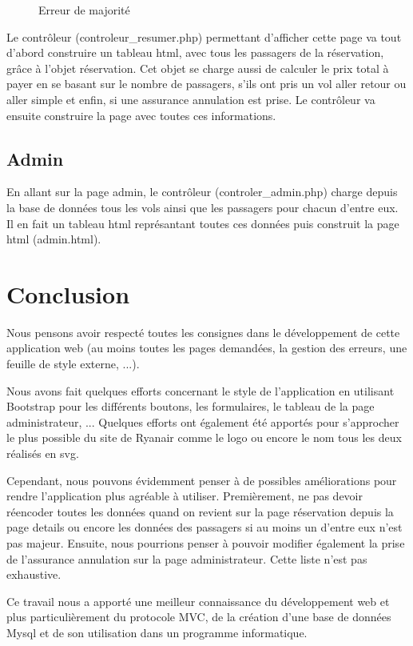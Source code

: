 \documentclass[12pt,a4paper]{article}
\begin{document}
			\begin{figure}
				\caption{Erreur de majorité}
				\label{fig:ageError}
			\end{figure}

			Le contrôleur (controleur\_resumer.php) permettant d'afficher cette page va tout d'abord construire un tableau html, avec tous les passagers  de la réservation, grâce à l'objet réservation. Cet objet se charge aussi de calculer le prix total à payer en se basant sur le nombre de passagers, s'ils ont pris un vol aller retour ou aller simple et enfin, si une assurance annulation est prise. Le contrôleur va ensuite construire la page avec toutes ces informations.

		\subsection{Admin}
			En allant sur la page admin, le contrôleur (controler\_admin.php) charge depuis la base de données tous les vols ainsi que les passagers pour chacun d'entre eux. Il en fait un tableau html représantant toutes ces données puis construit la page html (admin.html).

	\section*{Conclusion}
			Nous pensons avoir respecté toutes les consignes dans le développement de cette application web (au moins toutes les pages demandées, la gestion des erreurs, une feuille de style externe, ...).

			Nous avons fait quelques efforts concernant le style de l'application en utilisant Bootstrap pour les différents boutons, les formulaires, le tableau de la page administrateur, ... Quelques efforts ont également été apportés pour s'approcher le plus possible du site de Ryanair comme le logo ou encore le nom tous les deux réalisés en svg.

			Cependant, nous pouvons évidemment penser à de possibles améliorations pour rendre l'application plus agréable à utiliser. Premièrement, ne pas devoir réencoder toutes les données quand on revient sur la page réservation depuis la page details ou encore les données des passagers si au moins un d'entre eux n'est pas majeur. Ensuite, nous pourrions penser à pouvoir modifier également la prise de l'assurance annulation sur la page administrateur. Cette liste n'est pas exhaustive.

			Ce travail nous a apporté une meilleur connaissance du développement web et plus particulièrement du protocole MVC, de la création d'une base de données Mysql et de son utilisation dans un programme informatique.
\pagebreak
  \appendix
\end{document}
